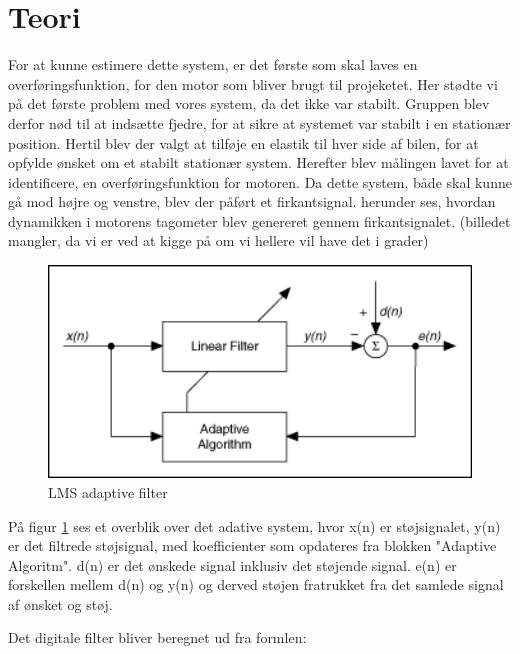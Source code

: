 \graphicspath{{Chapters/Teori/}}


\section{Teori}
For at kunne estimere dette system, er det første som skal laves en overføringsfunktion, for den motor som bliver brugt til projeketet. Her stødte vi på det første problem med vores system, da det ikke var stabilt. Gruppen blev derfor nød til at indsætte fjedre, for at sikre at systemet var stabilt i en stationær position. Hertil blev der valgt at tilføje en elastik til hver side af bilen, for at opfylde ønsket om et stabilt stationær system. 
Herefter blev målingen lavet for at identificere, en overføringsfunktion for motoren. Da dette system, både skal kunne gå mod højre og venstre, blev der påført et firkantsignal. herunder ses, hvordan dynamikken i motorens tagometer blev genereret gennem firkantsignalet. (billedet mangler, da vi er ved at kigge på om vi hellere vil have det i grader)      
   

\begin{figure}[H]
	\centering
	\includegraphics[width = 400pt]{Img/Figures}
	\caption{LMS adaptive filter}
	\label{fig:LMS_filter}
\end{figure}

På figur \ref{fig:LMS_filter} ses et overblik over det adative system, hvor x(n) er støjsignalet, y(n) er det filtrede støjsignal, med koefficienter som opdateres fra blokken "Adaptive Algoritm". d(n) er det ønskede signal inklusiv det støjende signal. e(n) er forskellen mellem d(n) og y(n) og derved støjen fratrukket fra det samlede signal af ønsket og støj.\cite{Teori}  \newline 


Det digitale filter bliver beregnet ud fra formlen:

